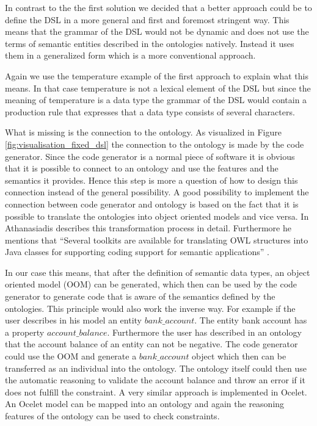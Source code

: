 \par
In contrast to the the first solution we decided that a better approach could be to define the DSL in a more general and first and foremost stringent way. This means that the grammar of the DSL would not be dynamic and does not use the terms of semantic entities described in the ontologies natively. Instead it uses them in a generalized form which is a more conventional approach.
\par
Again we use the temperature example of the first approach to explain what this means. In that case temperature is not a lexical element of the DSL but since the meaning of temperature is a data type the grammar of the DSL would contain a production rule that expresses that a data type consists of several characters.
\par
What is missing is the connection to the ontology. As visualized in Figure \ref{fig:visualisation_fixed_dsl} the connection to the ontology is made by the code generator. Since the code generator is a normal piece of software it is obvious that it is possible to connect to an ontology and use the features and the semantics it provides. Hence this step is more a question of how to design this connection instead of the general possibility. A good possibility to implement the connection between code generator and ontology is based on the fact that it is possible to translate the ontologies into object oriented models and vice versa. In \autocite{ontology:oom_mapping} Athanasiadis describes this transformation process in detail. Furthermore he mentions that ``Several toolkits are available for translating OWL structures into Java classes for supporting coding support for semantic applications'' \autocite[3]{ontology:oom_mapping}.
\par
 In our case this means, that after the definition of semantic data types, an object oriented model (OOM) can be generated, which then can be used by the code generator to generate code that is aware of the semantics defined by the ontologies. This principle would also work the inverse way. For example if the user describes in his model an entity $bank\_account$. The entity bank account has a property $account\_balance$. Furthermore the user has described in an ontology that the account balance of an entity can not be negative. The code generator could use the OOM and generate a $bank\_account$ object which then can be transferred as an individual into the ontology. The ontology itself could then use the automatic reasoning to validate the account balance and throw an error if it does not fulfill the constraint. A very similar approach is implemented in Ocelet. An Ocelet model can be mapped into an ontology and again the reasoning features of the ontology can be used to check constraints.
